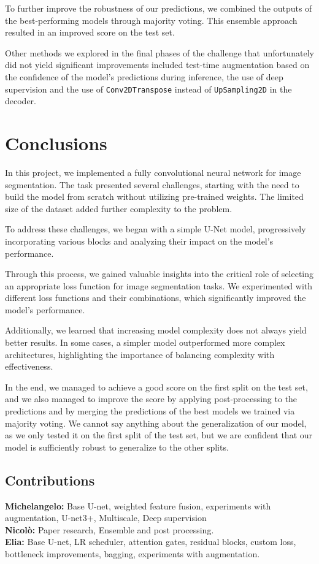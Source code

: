 \documentclass[11pt]{article}
\begin{document}
\begin{multicols}{2}
    To further improve the robustness of our predictions, we combined the outputs of the best-performing models through majority voting. This ensemble approach resulted in an improved score on the test set.

    Other methods we explored in the final phases of the challenge that unfortunately did not yield significant improvements included test-time augmentation based on the confidence of the model's predictions during inference, the use of deep supervision and the use of \texttt{Conv2DTranspose} instead of \texttt{UpSampling2D} in the decoder.

    \section{Conclusions}

    In this project, we implemented a fully convolutional neural network for image segmentation. The task presented several challenges, starting with the need to build the model from scratch without utilizing pre-trained weights. The limited size of the dataset added further complexity to the problem.

    To address these challenges, we began with a simple U-Net model, progressively incorporating various blocks and analyzing their impact on the model's performance.

    Through this process, we gained valuable insights into the critical role of selecting an appropriate loss function for image segmentation tasks. We experimented with different loss functions and their combinations, which significantly improved the model's performance.

    Additionally, we learned that increasing model complexity does not always yield better results. In some cases, a simpler model outperformed more complex architectures, highlighting the importance of balancing complexity with effectiveness.

    In the end, we managed to achieve a good score on the first split on the test set, and we also managed to improve the score by applying post-processing to the predictions and by merging the predictions of the best models we trained via majority voting. We cannot say anything about the generalization of our model, as we only tested it on the first split of the test set, but we are confident that our model is sufficiently robust to generalize to the other splits.

    \subsection*{Contributions}

    \textbf{Michelangelo:} Base U-net, weighted feature fusion, experiments with augmentation, U-net3+, Multiscale, Deep supervision\\
    \textbf{Nicolò:} Paper research, Ensemble and post processing. \\
    \textbf{Elia:} Base U-net, LR scheduler, attention gates, residual blocks, custom loss, bottleneck improvements, bagging, experiments with augmentation.\\

\end{multicols}


\end{document}
